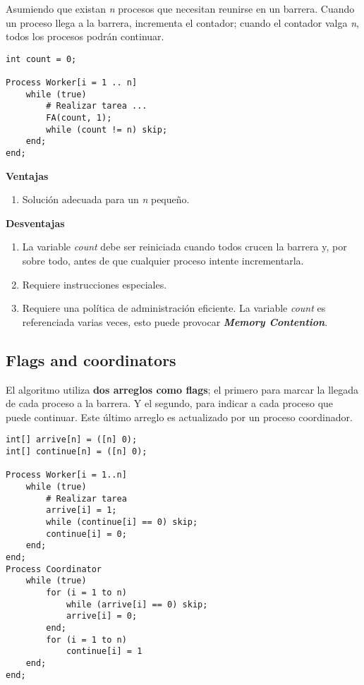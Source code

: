 \documentclass[a4paper, 10pt, margin=0in]{report}
\begin{document}
Asumiendo que existan \emph{n} procesos que necesitan reunirse en un barrera. Cuando un proceso llega a la barrera, incrementa el contador; cuando el contador valga \emph{n}, todos los procesos podrán continuar.

\begin{lstlisting}
int count = 0;

Process Worker[i = 1 .. n]
    while (true)
        # Realizar tarea ...
        FA(count, 1);
        while (count != n) skip;
    end;
end;
\end{lstlisting}

\textbf{Ventajas}
\begin{enumerate}
    \item Solución adecuada para un \emph{n} pequeño.
\end{enumerate}

\textbf{Desventajas}
\begin{enumerate}
    \item La variable \emph{count} debe ser reiniciada cuando todos crucen la barrera y, por sobre todo, antes de que cualquier proceso intente incrementarla.
    \item Requiere instrucciones especiales.
    \item Requiere una política de administración eficiente. La variable \emph{count} es referenciada varias veces, esto puede provocar \textbf{\emph{Memory Contention}}.
\end{enumerate}

\subsection{Flags and coordinators}

El algoritmo utiliza \textbf{dos arreglos como flags}; el primero para marcar la llegada de cada proceso a la barrera. Y el segundo, para indicar a cada proceso que puede continuar. Este último arreglo es actualizado por un proceso coordinador.

\begin{lstlisting}[multicols=2]
int[] arrive[n] = ([n] 0);
int[] continue[n] = ([n] 0);

Process Worker[i = 1..n]
    while (true)
        # Realizar tarea
        arrive[i] = 1;
        while (continue[i] == 0) skip;
        continue[i] = 0;
    end;
end;
Process Coordinator
    while (true)
        for (i = 1 to n)
            while (arrive[i] == 0) skip;
            arrive[i] = 0;
        end;
        for (i = 1 to n)
            continue[i] = 1
    end;
end;
\end{lstlisting}
\end{document}
